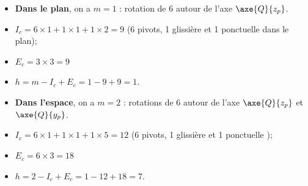 \begin{itemize}
\item \textbf{Dans le plan}, on a $m=1$ : rotation de 6 autour de l'axe $\axe{Q}{z_p}$.
\item $I_c = 6\times 1 + 1 \times 1 + 1 \times 2 = 9$ (6 pivots, 1 glissière et 1 ponctuelle dans le plan);
\item $E_c = 3 \times 3 = 9$
\item $h=m-I_c+E_c = 1-9+9 = 1$. 
\end{itemize}
\begin{itemize}
\item \textbf{Dans l'espace}, on a $m=2$ : rotations de 6 autour de l'axe $\axe{Q}{z_p}$ et $\axe{Q}{y_p}$.
\item $I_c = 6\times 1 + 1 \times 1 + 1 \times 5 = 12$ (6 pivots, 1 glissière et 1 ponctuelle );
\item $E_c = 6 \times 3 = 18$
\item $h=2-I_c+E_c = 1-12+18 = 7$. 
\end{itemize}
\else
\fi


\ifprof
\else
\ifcolle
\else
{}
 \fi

\fi